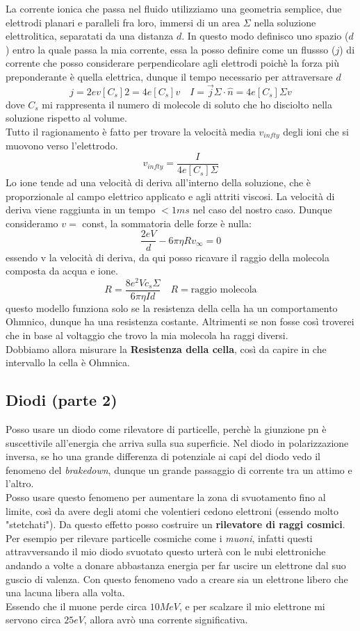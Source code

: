 \documentclass{article}
\begin{document}
La corrente ionica che passa nel fluido utilizziamo una geometria semplice, due elettrodi planari e paralleli fra loro,
immersi di un area $\Sigma$ nella soluzione elettrolitica, separatati da una distanza $d$. 
In questo modo definisco uno spazio ($d$) entro la quale passa la mia corrente, essa la posso definire come un flussso ($j$) di
corrente che posso considerare perpendicolare agli elettrodi poichè 
la forza più preponderante è quella elettrica, dunque il tempo necessario per attraversare $d$
\[
j=2ev[C_s]2=4e[C_s]v \quad I= \vec{j} \Sigma \cdot \hat{n}= 4e[C_s]\Sigma v
\]
dove $C_s$ mi rappresenta il numero di molecole di soluto che ho disciolto nella soluzione rispetto al volume. \\
Tutto il ragionamento è fatto per trovare la velocità media $v_{infty}$ degli ioni che si muovono verso l'elettrodo.
\[
v_{infty}=\frac{I}{4e[C_s]\Sigma} 
\]
Lo ione tende ad una velocità di deriva all'interno della soluzione, che è proporzionale al campo elettrico applicato e agli attriti viscosi. 
La velocità di deriva viene raggiunta in un tempo $< 1ms $ nel caso del nostro caso. Dunque consideramo $v =$ const, la sommatoria delle forze
è nulla:
\[
\frac{2eV}{d} - 6 \pi \eta R v_{\infty} =0
\]
essendo v la velocità di deriva, da qui posso ricavare il raggio della molecola composta da acqua e ione.
\[
R= \frac{8 e^2 V c_{s} \Sigma}{6 \pi \eta I d} \quad R= \text{raggio molecola}
\]
questo modello funziona solo se la resistenza della cella ha un comportamento Ohmnico, dunque ha una resistenza costante. 
Altrimenti se non fosse così troverei che in base al voltaggio che trovo la mia molecola ha raggi diversi. \\
Dobbiamo allora misurare la \textbf{Resistenza della cella}, così da capire in che intervallo la cella è Ohmnica. 

\subsection{Diodi (parte 2)}
Posso usare un diodo come rilevatore di particelle, perchè la giunzione pn è suscettivile all'energia che arriva sulla sua superficie.
Nel diodo in polarizzazione inversa, se ho una grande differenza di potenziale ai capi del diodo vedo il fenomeno del \textit{brakedown}, 
dunque un grande passaggio di corrente tra un attimo e l'altro. \\
Posso usare questo fenomeno per aumentare la zona di svuotamento fino al limite, così da avere degli atomi che volentieri cedono elettroni (essendo molto "stetchati"). Da questo effetto posso costruire un \textbf{rilevatore di raggi cosmici}. 
Per esempio per rilevare particelle cosmiche come i \textit{muoni}, infatti questi attravversando il mio diodo svuotato questo urterà con le nubi elettroniche andando a volte a donare abbastanza energia per far uscire un elettrone dal suo guscio di valenza. 
Con questo fenomeno vado a creare sia un elettrone libero che una lacuna libera alla volta.\\
Essendo che il muone perde circa $10 MeV$, e per scalzare il mio elettrone mi servono circa $25 eV$, allora avrò una corrente significativa. 
\end{document}
